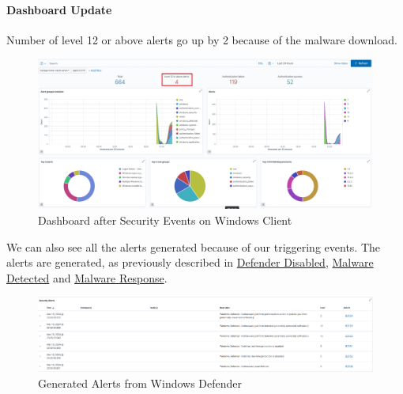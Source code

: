 \paragraph{Dashboard Update}
Number of level 12 or above alerts go up by 2 because of the malware download.
    \begin{figure}[H]
        \centering
        \includegraphics[width=\textwidth]{images/malware-detection/windows-log/5.png}
        \caption{Dashboard after Security Events on Windows Client}
        \label{fig:win-dashboard}
    \end{figure}
We can also see all the alerts generated because of our triggering events. The alerts are generated, as previously described in \hyperlink{defender-disabled}{Defender Disabled}, \hyperlink{detect-malware}{Malware Detected} and \hyperlink{response-malware}{Malware Response}.
    \begin{figure}[H]
        \centering
        \includegraphics[width=\textwidth]{images/malware-detection/windows-log/4.png}
        \caption{Generated Alerts from Windows Defender}
        \label{fig:win-def-alerts}
    \end{figure}
